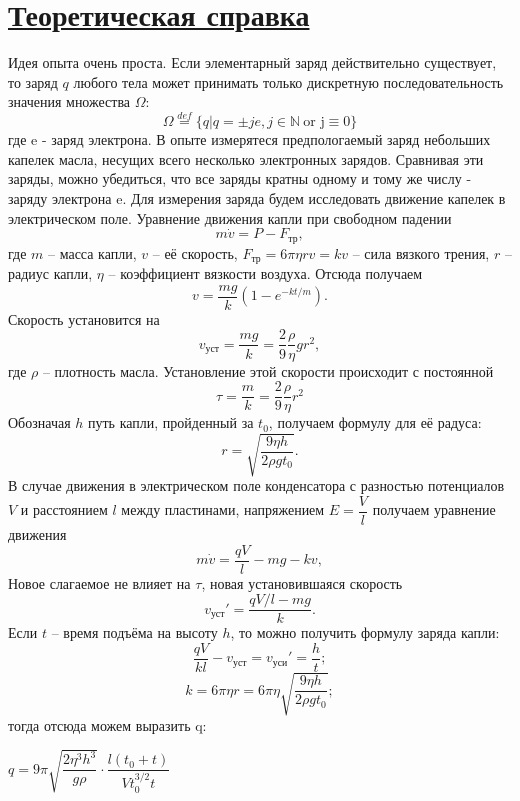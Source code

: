\documentclass[a4paper,12pt]{article} %
\begin{document}
	\section*{\textbf{\underline{Теоретическая справка}}}
	Идея опыта очень проста. Если элементарный заряд действительно существует, то заряд $q$ любого тела может принимать только дискретную последовательность значения множества $\Omega$:
	$$\Omega \stackrel{def}{=} \{ q | q = \pm je, j \in  \mathbb{N}\ \text{or j} \equiv 0\} $$
	где e - заряд электрона. В опыте измерятеся предпологаемый заряд небольших капелек масла, несущих всего несколько электронных зарядов. Сравнивая эти заряды, можно убедиться, что все заряды кратны одному и тому же числу - заряду электрона e.
	Для измерения заряда будем исследовать движение капелек в электрическом поле. Уравнение движения капли при свободном падении
	\begin{equation}
		m\dot{v}=P-F_{\text{тр}},
	\end{equation}
	где $m$ -- масса капли, $v$ -- её скорость, $F_{\text{тр}}=6\pi \eta rv = kv$ -- сила вязкого трения, $r$ -- радиус капли, $\eta$ -- коэффициент вязкости воздуха. Отсюда получаем 
	\begin{equation}
		v = \dfrac{mg}{k}\left(1 - e^{-kt/m}\right).
	\end{equation}
	Скорость установится на
	$$
	v_{\text{уст}}=\dfrac{mg}{k}=\dfrac{2}{9}\dfrac{\rho}{\eta}gr^2,
	$$
	где $\rho$ -- плотность масла. Установление этой скорости происходит с постоянной
	$$
	\tau = \dfrac{m}{k}=\dfrac{2}{9}\dfrac{\rho}{\eta}r^2
	$$
	Обозначая $h$ путь капли, пройденный за $t_0$, получаем формулу для её радуса:
	\begin{equation}
		r = \sqrt{\dfrac{9\eta h}{2\rho gt_0}}.
	\end{equation}
	В случае движения в электрическом поле конденсатора с разностью потенциалов $V$ и расстоянием $l$ между пластинами, напряжением $E = \dfrac{V}{l}$ получаем уравнение движения
	\begin{equation}
		m \dot{v}=\dfrac{qV}{l}-mg-kv,
	\end{equation}
	Новое слагаемое не влияет на $\tau$, новая установившаяся скорость
	$$
	v_{\text{уст}}'=\dfrac{qV/l - mg}{k}.
	$$
	Если $t$ -- время подъёма на высоту $h$, то можно получить формулу заряда капли:
	$$
	\dfrac{qV}{kl}-v_{\text{уст}}=v_{\text{уси}}'=\dfrac{h}{t};
	$$
	$$
	k=6\pi \eta r  = 6\pi \eta  \sqrt{\dfrac{9\eta h}{2\rho gt_0}};
	$$
	тогда отсюда можем выразить q:
	\begin{center}
		$q = 9\pi \sqrt{\dfrac{2\eta^3 h^3}{g\rho}}\cdot \dfrac{l(t_0+t)}{Vt^{3/2}_0t}$
	\end{center}
\end{document}
